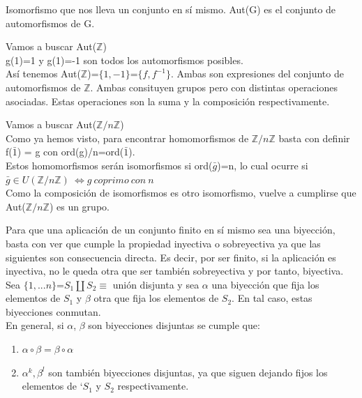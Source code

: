 \documentclass[nochap]{apuntes}
\begin{document}
\begin{defn}[Automorfismo]\label{defAutomorfismo}
 Isomorfismo que nos lleva un conjunto en sí mismo. Aut(G) es el conjunto de automorfismos de G.
\end{defn}

\begin{example}
 Vamos a buscar Aut($\mathbb{Z}$)\\
 g(1)=1 y g(1)=-1 son todos los automorfismos posibles.\\
 Así tenemos Aut($\mathbb{Z}$)=$\{1,-1\}$=$\{f, f^{-1}\}$. Ambas son expresiones del conjunto de automorfismos de $\mathbb{Z}$. Ambas
 consituyen grupos pero con distintas operaciones asociadas. Estas operaciones son la suma y la composición respectivamente.
\end{example}

\begin{example}
 Vamos a buscar Aut($\mathbb{Z}/n\mathbb{Z}$)\\
 Como ya hemos visto, para encontrar homomorfismos de $\mathbb{Z}/n\mathbb{Z}$  basta con definir f($\bar{1}$) = g con ord(g)/n=ord($\bar{1}$).\\
 Estos homomorfismos serán isomorfismos si  ord($\bar{g}$)=n, lo cual ocurre si $\bar{g}\in U(\mathbb{Z}/n\mathbb{Z}) \ \Leftrightarrow g \ coprimo \ con\ n$\\
 Como la composición de isomorfismos es otro isomorfismo, vuelve a cumplirse que Aut($\mathbb{Z}/n\mathbb{Z}$)  es un grupo.
\end{example}

Para que una aplicación de un conjunto finito en sí mismo sea una biyección, basta con ver que cumple la propiedad inyectiva o sobreyectiva
ya que las siguientes son consecuencia directa. Es decir, por ser finito, si la aplicación es inyectiva, no le queda otra que ser
también sobreyectiva y por tanto, biyectiva.\\

Sea $\{1,...n\}$=$S_1\coprod S_2\equiv$ unión disjunta y sea $\alpha$  una biyección que fija los elementos de $S_1$  y $\beta$
otra que fija los elementos de $S_2$. En tal caso, estas biyecciones conmutan.\\
En general, si $\alpha$,  $\beta$  son biyecciones disjuntas se cumple que:
\begin{enumerate}
 \item $\alpha \circ \beta = \beta \circ \alpha$
 \item $\alpha^{k}, \beta^{l}$  son también biyecciones disjuntas, ya que siguen dejando fijos los elementos de `$S_1$  y $S_2$  respectivamente.
\end{enumerate}
\end{document}
